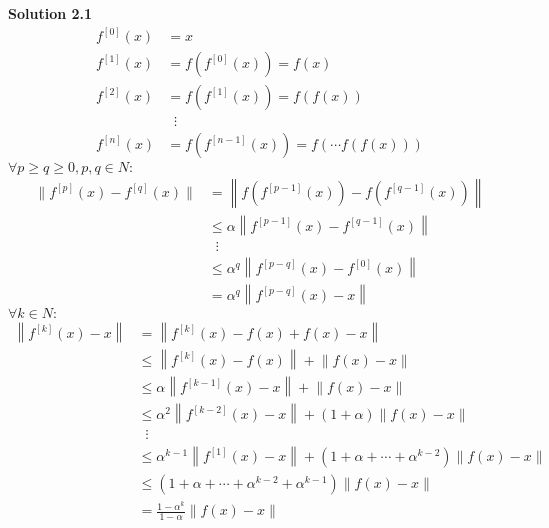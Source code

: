 \documentclass[a4paper,10.5pt]{article}
\newcommand{\norm}[1]{\left\lVert#1\right\rVert}
\begin{document}
\noindent \textbf {Solution 2.1} \\
\begin{align*}
	f^{[0]}(x) &= x \\
	f^{[1]}(x) &= f\left(f^{[0]}(x)\right) = f(x) \\
	f^{[2]}(x) &= f\left(f^{[1]}(x)\right) = f(f(x)) \\
			   & \;\; \vdots \\
	f^{[n]}(x) &= f\left(f^{[n-1]}(x)\right) = f(\cdots f(f(x)))		  
\end{align*}
$\forall p\geq q\geq 0, p,q\in N:$
\begin{align*}
	\|f^{[p]}(x)-f^{[q]}(x)\| &= \norm{f\left(f^{[p-1]}(x)\right)-f\left(f^{[q-1]}(x)\right)} \\
	&\leq \alpha \norm{f^{[p-1]}(x)-f^{[q-1]}(x)} \\
	& \; \; \vdots \\
	&\leq \alpha^{q} \norm{f^{[p-q]}(x)-f^{[0]}(x)} \\
	&= \alpha^q \norm{f^{[p-q]}(x)-x}
\end{align*}
$\forall k \in N:$
\begin{align*}
	\norm{f^{[k]}(x)-x} &= \norm{f^{[k]}(x)-f(x)+f(x)-x} \\
	&\leq \norm{f^{[k]}(x)-f(x)}+\norm{f(x)-x} \\
	&\leq \alpha\norm{f^{[k-1]}(x)-x}+\norm{f(x)-x} \\
	&\leq \alpha^2\norm{f^{[k-2]}(x)-x}+\left(1+\alpha\right)\norm{f(x)-x} \\
	& \;\; \vdots \\
	&\leq \alpha^{k-1}\norm{f^{[1]}(x)-x} + \left(1+\alpha+\cdots+\alpha^{k-2}\right)\norm{f(x)-x} \\
	&\leq \left(1+\alpha+\cdots+\alpha^{k-2}+\alpha^{k-1}\right)\norm{f(x)-x} \\
	&=\frac{1-\alpha^k}{1-\alpha}\norm{f(x)-x}
\end{align*}

\clearpage
\end{document}
